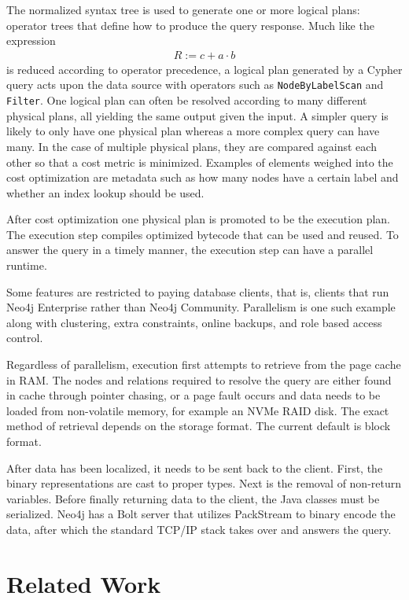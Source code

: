 \documentclass[PhD,single]{uclathes}
\begin{document}
The normalized syntax tree is used to generate one or more logical plans:
operator trees that define how to produce the query response. Much like the
expression
\begin{align*}
    R := c + a \cdot b
\end{align*}
is reduced according to operator precedence, a logical plan generated by a
Cypher query acts upon the data source with operators such as
\texttt{NodeByLabelScan} and \texttt{Filter}. One logical plan can often be
resolved according to many different physical plans, all yielding the same
output given the input. A simpler query is likely to only have one physical
plan whereas a more complex query can have many. In the case of multiple
physical plans, they are compared against each other so that a cost metric is
minimized. Examples of elements weighed into the cost optimization are metadata
such as how many nodes have a certain label and whether an index lookup should
be used.

After cost optimization one physical plan is promoted to be the execution plan.
The execution step compiles optimized bytecode that can be used and reused. To
answer the query in a timely manner, the execution step can have a parallel
runtime.

Some features are restricted to paying database clients, that is, clients that
run Neo4j Enterprise rather than Neo4j Community. Parallelism is one such
example along with clustering, extra constraints, online backups, and role
based access control.

Regardless of parallelism, execution first attempts to retrieve from the page
cache in RAM. The nodes and relations required to resolve the query are either
found in cache through pointer chasing, or a page fault occurs and data needs
to be loaded from non-volatile memory, for example an NVMe RAID disk. The exact
method of retrieval depends on the storage format. The current default is block
format.

After data has been localized, it needs to be sent back to the client. First,
the binary representations are cast to proper types. Next is the removal of
non-return variables. Before finally returning data to the client, the Java
classes must be serialized. Neo4j has a Bolt server that utilizes PackStream to
binary encode the data, after which the standard TCP/IP stack takes over and
answers the query.

\chapter{Related Work}
\end{document}
